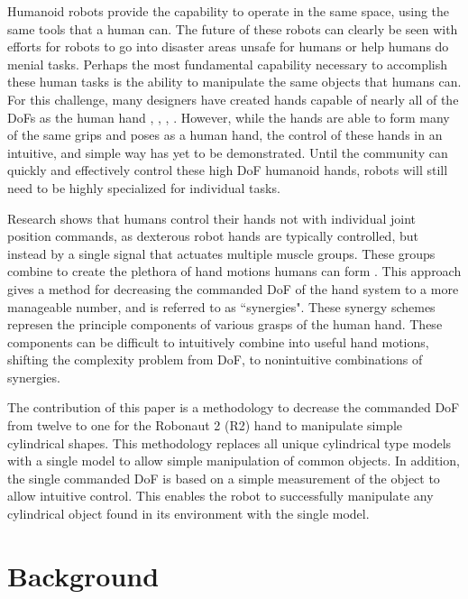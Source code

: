 \documentclass[runningheads,a4paper]{llncs}
\begin{document}
Humanoid robots provide the capability to operate in the same space, using the same tools that a human can. The future of these robots can clearly be seen with efforts for robots to go into disaster areas unsafe for humans \cite{fukushima_robots} or help humans do menial tasks. Perhaps the most fundamental capability necessary to accomplish these human tasks is the ability to manipulate the same objects that humans can. For this challenge, many designers have created hands capable of nearly all of the DoFs as the human hand \cite{r2_hand}, \cite{DRL}, \cite{hrp3}, \cite{softhand}. However, while the hands are able to form many of the same grips and poses as a human hand, the control of these hands in an intuitive, and simple way has yet to be demonstrated. Until the community can quickly and effectively control these high DoF humanoid hands, robots will still need to be highly specialized for individual tasks. \par
Research shows that humans control their hands not with individual joint position commands, as dexterous robot hands are typically controlled, but instead by a single signal that actuates multiple muscle groups. These groups combine to create the plethora of hand motions humans can form \cite{Santello} \cite{neuro}. This approach gives a method for decreasing the commanded DoF of the hand system to a more manageable number, and is referred to as ``synergies". These synergy schemes represen the principle components of various grasps of the human hand. These components can be difficult to intuitively combine into useful hand motions, shifting the complexity problem from DoF, to nonintuitive combinations of synergies. \par
The contribution of this paper is a methodology to decrease the commanded DoF from twelve to one for the Robonaut 2 (R2) hand to manipulate simple cylindrical shapes. This methodology replaces all unique cylindrical type models with a single model to allow simple manipulation of common objects. In addition, the single commanded DoF is based on a simple measurement of the object to allow intuitive control. This enables the robot to successfully manipulate any cylindrical object found in its environment with the single model.

\section{Background}
\end{document}
